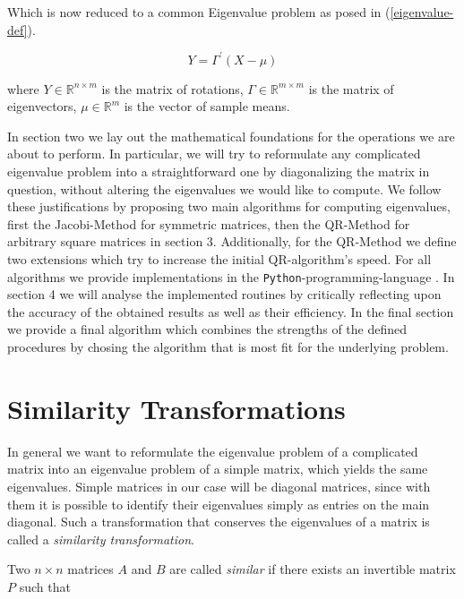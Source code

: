 \documentclass[12pt]{article}
\begin{document}
Which is now reduced to a common Eigenvalue problem as posed in (\ref{eigenvalue-def}).


\begin{equation}
\label{pca_sol}
	Y = \Gamma^{\prime} \left(X - \mu\right)
\end{equation}

where $Y \in \mathbb{R}^{n \times m}$ is the matrix of rotations, 
	  $\Gamma \in \mathbb{R}^{m \times m}$ is the matrix of eigenvectors,
	  $\mu \in \mathbb{R}^m$ is the vector of sample means. \cite{MVA}


In section two we lay out the mathematical foundations for the operations we are about to perform. In particular, we will try to reformulate any complicated eigenvalue problem into a straightforward one by diagonalizing the matrix in question, without altering the eigenvalues we would like to compute. We follow these justifications by proposing two main algorithms for computing eigenvalues, first the Jacobi-Method for symmetric matrices, then the QR-Method for arbitrary square matrices in section 3. Additionally, for the QR-Method we define two extensions which try to increase the initial QR-algorithm's speed.
For all algorithms we provide implementations in the \texttt{Python}-programming-language \cite{python, matplotlib, scipy}. In section 4 we will analyse the implemented routines by critically reflecting upon the accuracy of the obtained results as well as their efficiency. In the final section we provide a final algorithm which combines the strengths of the defined procedures by chosing the algorithm that is most fit for the underlying problem.
\section{Similarity Transformations}

In general we want to reformulate the eigenvalue problem of a complicated matrix into an eigenvalue problem of a simple matrix, which yields the same eigenvalues. Simple matrices in our case will be diagonal matrices, since with them it is possible to identify their eigenvalues simply as entries on the main diagonal. Such a transformation that conserves the eigenvalues of a matrix is called a \textit{similarity transformation}. 

Two $n \times n$ matrices $A$ and $B$ are called \textit{similar} if there exists an invertible matrix $P$ such that
\end{document}
